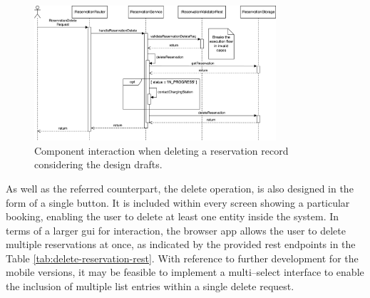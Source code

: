 \newpage

\begin{figure}[h]
    \centering
    \includegraphics[width=0.8\textwidth,keepaspectratio]{resources/images/main/6_implementation/processes/ReservationDelete.png}
    \caption{Component interaction when deleting a reservation record considering the design drafts.}
    \label{fig:delete-reservation-seqflow}
\end{figure}

\noindent As well as the referred counterpart, the delete operation, is also designed in the form of a single button. It is included within every screen showing a particular booking, enabling the user to delete at least one entity inside the system.
In terms of a larger \acrshort{gui} for interaction, the browser app allows the user to delete multiple reservations at once, as indicated by the provided \acrshort{rest} endpoints in the Table \ref{tab:delete-reservation-rest}.
With reference to further development for the mobile versions, it may be feasible to implement a multi--select interface to enable the inclusion of multiple list entries within a single delete request.

